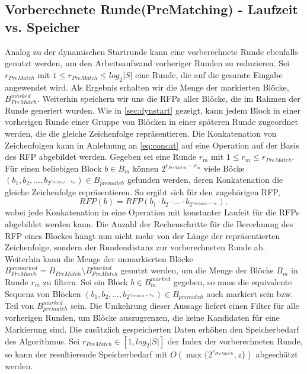 \subsection{Vorberechnete Runde(PreMatching) - Laufzeit vs. Speicher}
Analog zu der dynamischen Startrunde kann eine vorberechnete Runde ebenfalls genutzt werden, um den Arbeitsaufwand vorheriger Runden zu reduzieren. Sei $r_{PreMatch}$ mit 
$1\leq r_{PreMatch} \leq log_2{|S|}$ eine Runde, die auf die gesamte Eingabe angewendet wird. Als Ergebnis erhalten wir die Menge der markierten Blöcke, $B_{PreMatch}^{marked}$.
Weiterhin speichern wir uns die RFPs aller Blöcke, die im Rahmen der Runde generiert wurden. Wie in \ref{sec:dynstart} gezeigt, kann jedem Block in einer vorherigen Runde einer Gruppe
von Blöcken in einer späteren Runde zugeordnet werden, die die gleiche Zeichenfolge repräsentieren. Die Konkatenation von Zeichenfolgen kann in Anlehnung an \ref{eq:concat} auf eine
Operation auf der Basis des RFP abgebildet werden. Gegeben sei eine Runde $r_m$ mit $1\leq r_m \leq r_{PreMatch}$. Für einen beliebigen Block $b \in B_m$ können 
$2^{r_{PreMatch}-r_m}$ viele Böcke $(b_1, b_2, ..., b_{2^{r_{PreMatch}-r_m}})\in B_{prematch}$ gefunden werden, deren Konkatenation die gleiche Zeichenfolge repräsentieren. So ergibt sich 
für den zugehörigen RFP,
\begin{equation}
    RFP(b) = RFP(b_1 \cdot b_2 \cdot ... \cdot b_{2^{r_{PreMatch}-r_m}}),
\end{equation}
wobei jede Konkatenation in eine Operation mit konstanter Laufeit für die RFPs abgebildet werden kann. Die Anzahl der Rechenschritte für die Berechnung des RFP eines Blockes hängt nun 
nicht mehr von der Länge der repräsentierten Zeichenfolge, sondern der Rundendistanz zur vorberechneten Runde ab.
Weiterhin kann die Menge der unmarkierten Blöcke $B_{PreMatch}^{unmarked}=B_{PreMatch}\setminus B_{PreMatch}^{marked}$ genutzt werden, um die Menge der Blöcke $B_m$ in Runde $r_m$
zu filtern. Sei ein Block $b \in B_m^{marked}$ gegeben, so muss die equivalente Sequenz von Blöcken $(b_1, b_2, ..., b_{2^{r_{PreMatch}-r_m}})\in B_{prematch}$ auch markiert sein bzw.
Teil von $B_{prematch}^{marked}$ sein.
Die Umkehrung dieser Aussage liefert einen Filter für alle vorherigen Runden, um Blöcke auszugrenzen, die keine Kandidaten für eine Markierung sind. Die zusätzlich gespeicherten Daten 
erhöhen den Speicherbedarf des Algorithmus. 
Sei $r_{PreMatch}\in [1, log_2{|S|}]$ der Index der vorberechneten Runde, so kann der resultierende Speicherbedarf mit $O(\max\{2^{r_{PreMatch}}, z\})$ abgeschätzt werden.

